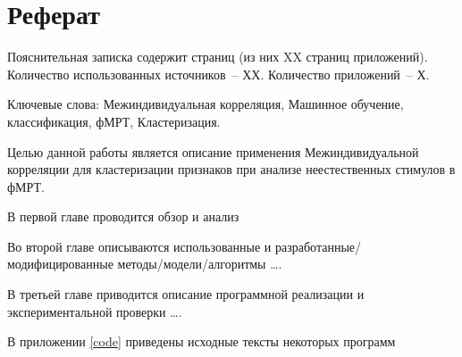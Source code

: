 \chapter*{Реферат}

Пояснительная записка содержит страниц (из них XX страниц приложений).   Количество использованных источников~-- ХХ. Количество приложений~-- Х.

Ключевые слова: Межиндивидуальная корреляция, Машинное обучение, классификация, фМРТ, Кластеризация.

Целью данной работы является описание применения Межиндивидуальной корреляции для кластеризации признаков при анализе неестественных стимулов в фМРТ.

В первой главе проводится обзор и анализ 

Во второй главе описываются использованные и разработанные/модифицированные методы/модели/алгоритмы \dots. 

В третьей главе приводится описание программной реализации и экспериментальной проверки \dots.

В приложении \ref{code} приведены исходные тексты некоторых программ